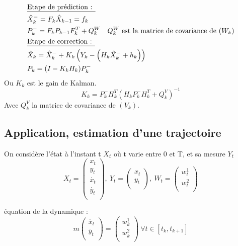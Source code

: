 \documentclass{article}
\begin{document}
\begin{align*}
   &\text{\underline{Etape de prédiction : }}\\
   &\hat{X}_{k}^{-}=F_k\hat{X}_{k-1} =f_{k}\\
   &P_{k}^{-}=F_{k}P_{k-1}F_{k}^{T}+Q_{k}^{W} \quad Q_{k}^{W}\text{ est la matrice de covariance de } (W_{k})\\
   &\text{\underline{Etape de correction : }}\\
   &\hat{X}_{k}= \hat{X}_{k}^{-}+K_{k}\left(Y_{k}-\left(H_{k}\hat{X}_{k}^{-}+h_k\right)\right)\\
   &P_k = (I-K_{k}H_{k})P_{k}^{-}
\end{align*}
Ou $K_k$ est le gain de Kalman. 
\[K_{k}= P_{k}^{-}H_{k}^{T}\left(H_{k}P_{k}^{-}H_{k}^{T}+Q_{k}^{V}\right)^{-1}\]
Avec $Q_{k}^{V}$ la matrice de covariance de $(V_k)$.


\subsection{Application, estimation d'une trajectoire}

On considère l'état à l'instant t $X_t$ où t varie entre 0 et T, et sa mesure $Y_t$
\[ X_t = \left (
   \begin{array}{c}
      x_t \\
      y_t \\
      \Dot{x_t} \\
      \Dot{y_t} \\
   \end{array} \right )
   ,\ Y_t = \left (
   \begin{array}{c}
      x_t \\
      y_t \\
   \end{array} \right )
   ,\ W_t = \left (
   \begin{array}{c}
      w_t^1 \\
      w_t^2 \\
   \end{array} \right )
\]

équation de la dynamique : 
\[ m \left (
   \begin{array}{c}
      \ddot{x_t} \\
      \ddot{y_t} \\
   \end{array} \right )
   = \left (
   \begin{array}{c}
      w_k^1 \\
      w_k^2 \\
   \end{array} \right )\ 
   \forall t \in [t_k, t_{k+1}]
\]
\end{document}
